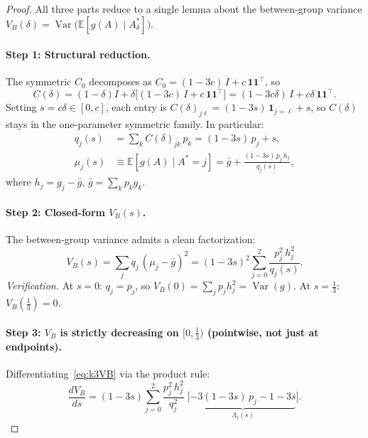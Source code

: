 
\begin{proof}
All three parts reduce to a single lemma about the between-group variance
$V_B(\delta)=\operatorname{Var}\bigl(\mathbb{E}[g(A)\mid A^*_\delta]\bigr)$.

\paragraph{Step 1: Structural reduction.}
The symmetric $C_0$ decomposes as $C_0=(1{-}3c)\,I+c\,\mathbf{1}\mathbf{1}^\top$, so
\[
  C(\delta) = (1{-}\delta)I + \delta\bigl[(1{-}3c)\,I+c\,\mathbf{1}\mathbf{1}^\top\bigr]
  = (1{-}3c\delta)\,I + c\delta\,\mathbf{1}\mathbf{1}^\top.
\]
Setting $s=c\delta\in[0,c]$, each entry is
$C(\delta)_{j\ell}=(1{-}3s)\,\mathbf{1}_{j=\ell}+s$,
so $C(\delta)$ stays in the one-parameter symmetric family.
In particular:
\begin{align}
  q_j(s) &= \textstyle\sum_k C(\delta)_{jk}\,p_k = (1{-}3s)\,p_j + s, \label{eq:k3q} \\
  \mu_j(s) &\equiv \mathbb{E}[g(A)\mid A^*{=}j]
  = \bar{g} + \frac{(1{-}3s)\,p_j\,h_j}{q_j(s)}, \label{eq:k3mu}
\end{align}
where $h_j=g_j-\bar{g}$, $\bar{g}=\sum_k p_k g_k$.

\paragraph{Step 2: Closed-form $V_B(s)$.}
The between-group variance admits a clean factorization:
\begin{equation}
  V_B(s) = \sum_j q_j\,(\mu_j-\bar{g})^2
  = (1{-}3s)^2\sum_{j=0}^{2}\frac{p_j^2\,h_j^2}{q_j(s)}.
  \label{eq:k3VB}
\end{equation}
\emph{Verification.}
At $s{=}0$: $q_j{=}p_j$, so $V_B(0)=\sum_j p_j h_j^2=\operatorname{Var}(g)$.
At $s{=}\tfrac{1}{3}$: $V_B(\tfrac{1}{3})=0$.

\paragraph{Step 3: $V_B$ is strictly decreasing on $[0,\tfrac{1}{3})$ (pointwise, not just at endpoints).}
Differentiating~\eqref{eq:k3VB} via the product rule:
\begin{equation}
  \frac{dV_B}{ds}
  = (1{-}3s)\sum_{j=0}^{2}\frac{p_j^2\,h_j^2}{q_j^2}\;\bigl[\underbrace{-3(1{-}3s)\,p_j - 1 - 3s}_{\displaystyle\Lambda_j(s)}\bigr].
  \label{eq:k3dVB}
\end{equation}


\end{proof}
